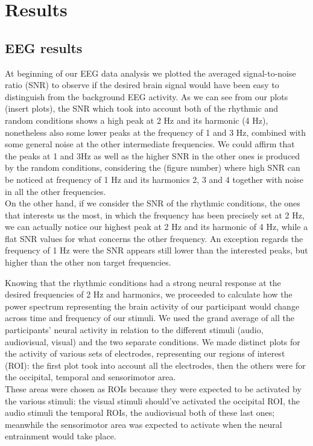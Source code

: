 \chapter{Results}
\section{EEG results}
At beginning of our EEG data analysis we plotted the averaged signal-to-noise ratio (SNR) to observe if the desired brain signal would have been easy to distinguish from the background EEG activity. As we can see from our plots (insert plots), the SNR which took into account both of the rhythmic and random conditions shows a high peak at 2 Hz and its harmonic (4 Hz), nonetheless also some lower peaks at the frequency of 1 and 3 Hz, combined with some general noise at the other intermediate frequencies. We could affirm that the peaks at 1 and 3Hz as well as the higher SNR in the other ones is produced by the random conditions, considering the (figure number) where high SNR can be noticed at frequency of 1 Hz and its harmonics 2, 3 and 4 together with noise in all the other frequencies. \\
On the other hand, if we consider the SNR of the rhythmic conditions, the ones that interests us the most, in which the frequency has been precisely set at 2 Hz, we can actually notice our highest peak at 2 Hz and its harmonic of 4 Hz, while a flat SNR values for what concerns the other frequency. An exception regards the frequency of 1 Hz were the SNR appears still lower than the interested peaks, but higher than the other non target frequencies. 

Knowing that the rhythmic conditions had a strong neural response at the desired frequencies of 2 Hz and harmonics, we proceeded to calculate how the power spectrum representing the brain activity of our participant would change across time and frequency of our stimuli. We used the grand average of all the participants' neural activity in relation to the different stimuli (audio, audiovisual, visual) and the two separate conditions. We made distinct plots for the activity of various sets of electrodes, representing our regions of interest (ROI): the first plot took into account all the electrodes, then the others were for the occipital, temporal and sensorimotor area. \\
These areas were chosen as ROIs because they were expected to be activated by the various stimuli: the visual stimuli should've activated the occipital ROI, the audio stimuli the temporal ROIs, the audiovisual both of these last ones; meanwhile the sensorimotor area was expected to activate when the neural entrainment would take place. 

